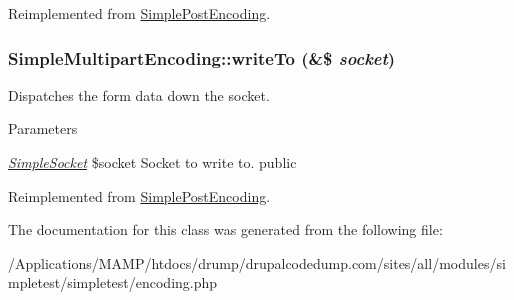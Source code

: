 Reimplemented from \hyperlink{class_simple_post_encoding_a4e637e85bb8511a0b38e234388cb330b}{SimplePostEncoding}.\hypertarget{class_simple_multipart_encoding_acaedbfc33a85c6db3ea616491b00442b}{
\subsubsection[{writeTo}]{\setlength{\rightskip}{0pt plus 5cm}SimpleMultipartEncoding::writeTo (\&\$ {\em socket})}}
\label{class_simple_multipart_encoding_acaedbfc33a85c6db3ea616491b00442b}
Dispatches the form data down the socket. 
\begin{DoxyParams}{Parameters}
\item[{\em \hyperlink{class_simple_socket}{SimpleSocket}}]\$socket Socket to write to.  public \end{DoxyParams}


Reimplemented from \hyperlink{class_simple_post_encoding_a45d035ce0ffe9358dd7e30c657f2fa5e}{SimplePostEncoding}.

The documentation for this class was generated from the following file:\begin{DoxyCompactItemize}
\item 
/Applications/MAMP/htdocs/drump/drupalcodedump.com/sites/all/modules/simpletest/simpletest/encoding.php\end{DoxyCompactItemize}
